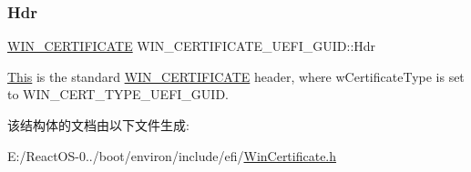 \subsubsection{\texorpdfstring{Hdr}{Hdr}}
{\footnotesize\ttfamily \hyperlink{struct_w_i_n___c_e_r_t_i_f_i_c_a_t_e}{W\+I\+N\+\_\+\+C\+E\+R\+T\+I\+F\+I\+C\+A\+TE} W\+I\+N\+\_\+\+C\+E\+R\+T\+I\+F\+I\+C\+A\+T\+E\+\_\+\+U\+E\+F\+I\+\_\+\+G\+U\+I\+D\+::\+Hdr}

\hyperlink{namespace_this}{This} is the standard \hyperlink{struct_w_i_n___c_e_r_t_i_f_i_c_a_t_e}{W\+I\+N\+\_\+\+C\+E\+R\+T\+I\+F\+I\+C\+A\+TE} header, where w\+Certificate\+Type is set to W\+I\+N\+\_\+\+C\+E\+R\+T\+\_\+\+T\+Y\+P\+E\+\_\+\+U\+E\+F\+I\+\_\+\+G\+U\+ID. 

该结构体的文档由以下文件生成\+:\begin{DoxyCompactItemize}
\item 
E\+:/\+React\+O\+S-\/0../boot/environ/include/efi/\hyperlink{_win_certificate_8h}{Win\+Certificate.\+h}\end{DoxyCompactItemize}
